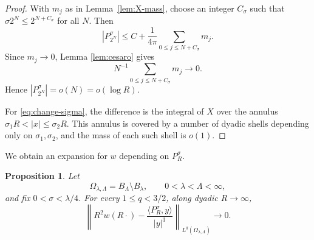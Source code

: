 \documentclass[11pt]{amsart}
\numberwithin{equation}{section}
\newtheorem{proposition}[theorem]{Proposition}
\theoremstyle{definition}
\newcommand{\ip}[2]{\langle #1,#2\rangle}
\newcommand{\abs}[1]{\left\lvert #1\right\rvert}
\begin{document}
\begin{proof}
With $m_j$ as in Lemma~\ref{lem:X-mass}, choose an integer $C_\sigma$ such that $\sigma 2^N\le2^{N+C_\sigma}$ for all $N$.  Then
$$
        \abs{P_{2^N}^\sigma}
        \le C+\frac1{4\pi}\sum_{0\le j\le N+C_\sigma}m_j.
$$
Since $m_j\to0$, Lemma \ref{lem:cesaro} gives
$$
        N^{-1}\sum_{0\le j\le N+C_\sigma}m_j\to0.
$$
Hence $\abs{P_{2^N}^\sigma}=o(N)=o(\log R)$.

For \eqref{eq:change-sigma}, the difference is the integral of $X$ over the annulus $\sigma_1R<\abs x\le \sigma_2R$.  This annulus is covered by a number of dyadic shells depending only on $\sigma_1,\sigma_2$, and the mass of each such shell is $o(1)$.
\end{proof}

We obtain an expansion for $w$ depending on $P_R^\sigma$.
\begin{proposition}\label{prop:w-moving}
Let
$$
        \Omega_{\lambda,\Lambda}=B_\Lambda\setminus B_\lambda,
        \qquad 0<\lambda<\Lambda<\infty,
$$
and fix $0<\sigma<\lambda/4$.  For every $1\le q<3/2$, along dyadic $R\to\infty$,
\begin{equation}\label{eq:w-moving}
        \left\|R^2w(R\cdot)-\frac{\ip{P_R^\sigma}{y}}{\abs y^3}\right\|_{L^q(\Omega_{\lambda,\Lambda})}\to0.
\end{equation}
\end{proposition}
\end{document}
